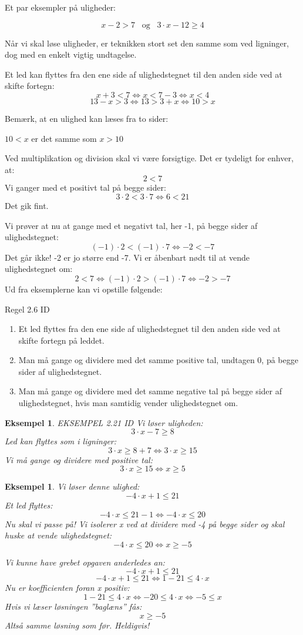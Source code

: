 \documentclass[12pt,oneside,a4paper]{article}
\newtheorem{eks}[thm]{Eksempel}
\begin{document}
Et par eksempler på uligheder:

$$
x-2>7 \;\;\; \text{og} \;\;\; 3\cdot x-12\geq 4
$$

Når vi skal løse uligheder, er teknikken stort set den samme som ved ligninger, dog med en enkelt vigtig undtagelse.

Et led kan flyttes fra den ene side af ulighedstegnet til den anden side ved at skifte fortegn:
$$
x+3<7 \Leftrightarrow x<7-3 \Leftrightarrow x<4
$$
$$
13-x>3 \Leftrightarrow 13>3+x \Leftrightarrow 10>x
$$

Bemærk, at en ulighed kan læses fra to sider:

$10 < x$ er det samme som $x > 10$

Ved multiplikation og division skal vi være forsigtige. Det er tydeligt for enhver, at:
$$
2<7
$$
Vi ganger med et positivt tal på begge sider:
$$
3 \cdot 2 <3 \cdot 7 \Leftrightarrow 6<21
$$
Det gik fint.

Vi prøver at nu at gange med et negativt tal, her -1, på begge sider af ulighedstegnet:
$$
(-1) \cdot 2 < (-1) \cdot 7 \Leftrightarrow -2<-7
$$
Det går ikke! -2 er jo større end -7. Vi er åbenbart nødt til at vende ulighedstegnet om:
$$
2<7 \Leftrightarrow (-1) \cdot 2 > (-1) \cdot 7 \Leftrightarrow -2>-7
$$
Ud fra eksemplerne kan vi opstille følgende:

Regel 2.6 ID
\begin{enumerate}
    \item Et led flyttes fra den ene side af ulighedstegnet til den anden side ved at skifte fortegn på leddet.
    \item Man må gange og dividere med det samme positive tal, undtagen 0, på begge sider af ulighedstegnet.
    \item Man må gange og dividere med det samme negative tal på begge sider af ulighedstegnet, hvis man samtidig vender ulighedstegnet om.
\end{enumerate}

\begin{eks}
EKSEMPEL 2.21 ID
Vi løser uligheden:
$$
3 \cdot x - 7 \geq 8
$$
Led kan flyttes som i ligninger:
$$
3 \cdot x \geq 8+7 \Leftrightarrow 3 \cdot x \geq 15
$$
Vi må gange og dividere med positive tal:
$$
3 \cdot x \geq 15 \Leftrightarrow x \geq 5
$$
\end{eks}

\begin{eks}
Vi løser denne ulighed:
$$
-4 \cdot x + 1 \leq 21
$$
Et led flyttes:
$$
-4 \cdot x \leq 21 -1 \Leftrightarrow -4 \cdot x \leq 20
$$
Nu skal vi passe på! Vi isolerer x ved at dividere med -4 på begge sider og skal huske at vende ulighedstegnet:
$$
-4 \cdot x \leq 20 \Leftrightarrow x \geq-5
$$

Vi kunne have grebet opgaven anderledes an:
$$
-4 \cdot x + 1 \leq 21
$$
$$
-4 \cdot x + 1 \leq 21 \Leftrightarrow 1 - 21 \leq 4 \cdot x
$$
Nu er koefficienten foran x positiv:
$$
1-21 \leq 4 \cdot x \Leftrightarrow -20 \leq 4 \cdot x \Leftrightarrow -5 \leq x
$$
Hvis vi læser løsningen ”baglæns” fås:
$$
x \geq -5
$$
Altså samme løsning som før. Heldigvis!
\end{eks}
\end{document}
